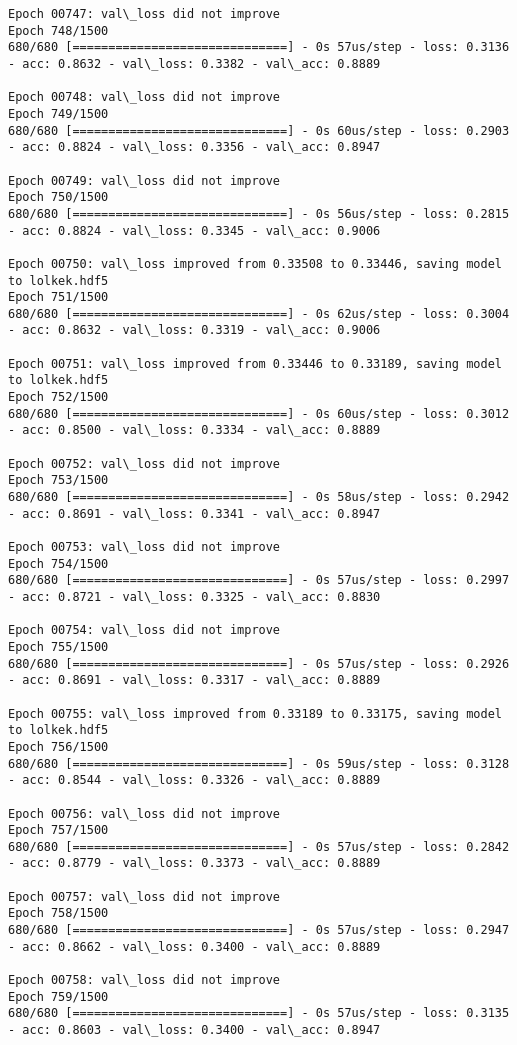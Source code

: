 \documentclass[11pt]{article}
\begin{document}
\begin{Verbatim}[commandchars=\\\{\}]
Epoch 00747: val\_loss did not improve
Epoch 748/1500
680/680 [==============================] - 0s 57us/step - loss: 0.3136 - acc: 0.8632 - val\_loss: 0.3382 - val\_acc: 0.8889

Epoch 00748: val\_loss did not improve
Epoch 749/1500
680/680 [==============================] - 0s 60us/step - loss: 0.2903 - acc: 0.8824 - val\_loss: 0.3356 - val\_acc: 0.8947

Epoch 00749: val\_loss did not improve
Epoch 750/1500
680/680 [==============================] - 0s 56us/step - loss: 0.2815 - acc: 0.8824 - val\_loss: 0.3345 - val\_acc: 0.9006

Epoch 00750: val\_loss improved from 0.33508 to 0.33446, saving model to lolkek.hdf5
Epoch 751/1500
680/680 [==============================] - 0s 62us/step - loss: 0.3004 - acc: 0.8632 - val\_loss: 0.3319 - val\_acc: 0.9006

Epoch 00751: val\_loss improved from 0.33446 to 0.33189, saving model to lolkek.hdf5
Epoch 752/1500
680/680 [==============================] - 0s 60us/step - loss: 0.3012 - acc: 0.8500 - val\_loss: 0.3334 - val\_acc: 0.8889

Epoch 00752: val\_loss did not improve
Epoch 753/1500
680/680 [==============================] - 0s 58us/step - loss: 0.2942 - acc: 0.8691 - val\_loss: 0.3341 - val\_acc: 0.8947

Epoch 00753: val\_loss did not improve
Epoch 754/1500
680/680 [==============================] - 0s 57us/step - loss: 0.2997 - acc: 0.8721 - val\_loss: 0.3325 - val\_acc: 0.8830

Epoch 00754: val\_loss did not improve
Epoch 755/1500
680/680 [==============================] - 0s 57us/step - loss: 0.2926 - acc: 0.8691 - val\_loss: 0.3317 - val\_acc: 0.8889

Epoch 00755: val\_loss improved from 0.33189 to 0.33175, saving model to lolkek.hdf5
Epoch 756/1500
680/680 [==============================] - 0s 59us/step - loss: 0.3128 - acc: 0.8544 - val\_loss: 0.3326 - val\_acc: 0.8889

Epoch 00756: val\_loss did not improve
Epoch 757/1500
680/680 [==============================] - 0s 57us/step - loss: 0.2842 - acc: 0.8779 - val\_loss: 0.3373 - val\_acc: 0.8889

Epoch 00757: val\_loss did not improve
Epoch 758/1500
680/680 [==============================] - 0s 57us/step - loss: 0.2947 - acc: 0.8662 - val\_loss: 0.3400 - val\_acc: 0.8889

Epoch 00758: val\_loss did not improve
Epoch 759/1500
680/680 [==============================] - 0s 57us/step - loss: 0.3135 - acc: 0.8603 - val\_loss: 0.3400 - val\_acc: 0.8947


\end{Verbatim}
\end{document}
